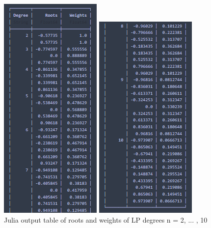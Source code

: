 \documentclass[twoside]{article}
\begin{document}
\begin{figure}[H]
    \centering
    \begin{minipage}{0.5\textwidth}
        \centering
        \includegraphics[scale=0.65]{img/table_2-7.png}
    \end{minipage}\hfill
    \begin{minipage}{0.5\textwidth}
        \centering
        \includegraphics[scale=0.65]{img/table_8-10.png}
    \end{minipage}
\caption{Julia output table of roots and weights of LP degrees n = 2, ... , 10}
\end{figure}
\end{document}
